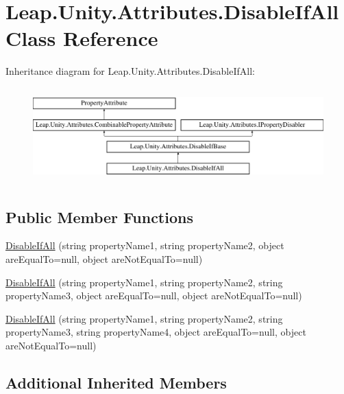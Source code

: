 \hypertarget{class_leap_1_1_unity_1_1_attributes_1_1_disable_if_all}{}\section{Leap.\+Unity.\+Attributes.\+Disable\+If\+All Class Reference}
\label{class_leap_1_1_unity_1_1_attributes_1_1_disable_if_all}
Inheritance diagram for Leap.\+Unity.\+Attributes.\+Disable\+If\+All\+:\begin{figure}[H]
\begin{center}
\leavevmode
\includegraphics[height=3.696370cm]{class_leap_1_1_unity_1_1_attributes_1_1_disable_if_all}
\end{center}
\end{figure}
\subsection*{Public Member Functions}
\begin{DoxyCompactItemize}
\item 
\mbox{\hyperlink{class_leap_1_1_unity_1_1_attributes_1_1_disable_if_all_a93ab51e614d37c601e08acb9e5988225}{Disable\+If\+All}} (string property\+Name1, string property\+Name2, object are\+Equal\+To=null, object are\+Not\+Equal\+To=null)
\item 
\mbox{\hyperlink{class_leap_1_1_unity_1_1_attributes_1_1_disable_if_all_a47a6689ad0c92142b85a6e63d7222785}{Disable\+If\+All}} (string property\+Name1, string property\+Name2, string property\+Name3, object are\+Equal\+To=null, object are\+Not\+Equal\+To=null)
\item 
\mbox{\hyperlink{class_leap_1_1_unity_1_1_attributes_1_1_disable_if_all_af46624d8f1b932cc84de816738ede014}{Disable\+If\+All}} (string property\+Name1, string property\+Name2, string property\+Name3, string property\+Name4, object are\+Equal\+To=null, object are\+Not\+Equal\+To=null)
\end{DoxyCompactItemize}
\subsection*{Additional Inherited Members}



